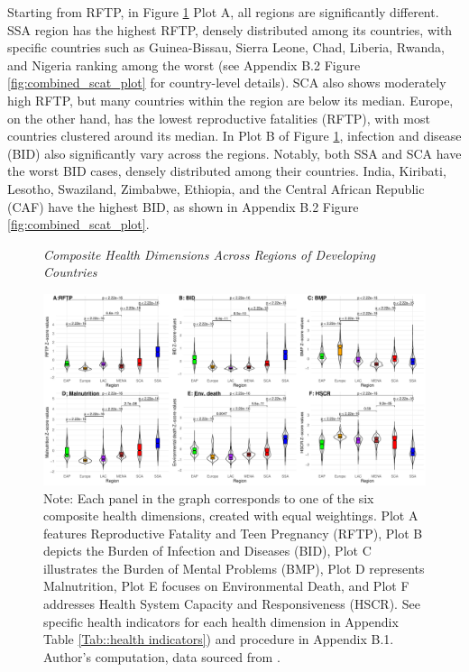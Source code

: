 Starting from RFTP, in Figure \ref{fig:combined_Box_plot} Plot A, all regions are significantly different. SSA region has the highest RFTP, densely distributed among its countries, with specific countries such as Guinea-Bissau, Sierra Leone, Chad, Liberia, Rwanda, and Nigeria ranking among the worst (see Appendix B.2 Figure \ref{fig:combined_scat_plot} for country-level details). SCA also shows moderately high RFTP, but many countries within the region are below its median. Europe, on the other hand, has the lowest reproductive fatalities (RFTP), with most countries clustered around its median. In Plot B of Figure \ref{fig:combined_Box_plot}, infection and disease (BID) also significantly vary across the regions. Notably, both SSA and SCA have the worst BID cases, densely distributed among their countries. India, Kiribati, Lesotho, Swaziland, Zimbabwe, Ethiopia, and the Central African Republic (CAF) have the highest BID, as shown in Appendix B.2 Figure \ref{fig:combined_scat_plot}.


\begin{landscape}
    \begin{figure}[ht]
\captionsetup{justification=justified,singlelinecheck=false}
\caption{\textit{Composite Health Dimensions Across Regions of Developing Countries}}
    \centering \includegraphics[width = 1.65\textwidth]{Figures/Health_Outcome_Graph/Combined_Boxplt_2.pdf}
    \caption*{\footnotesize{Note: Each panel in the graph corresponds to one of the six composite health dimensions, created with equal weightings. Plot A features Reproductive Fatality and Teen Pregnancy (RFTP), Plot B depicts the Burden of Infection and Diseases (BID), Plot C illustrates the Burden of Mental Problems (BMP), Plot D represents Malnutrition, Plot E focuses on Environmental Death, and Plot F addresses Health System Capacity and Responsiveness (HSCR). See specific health indicators for each health dimension in Appendix Table \ref{Tab::health indicators}) and procedure in Appendix B.1. Author's computation, data sourced from \textcite{unsdg_sustainable_2023, wdi_world_2023}.}}
    \label{fig:combined_Box_plot}
\end{figure}
\end{landscape}


